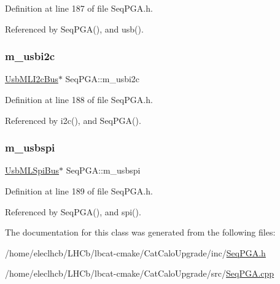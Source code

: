 Definition at line 187 of file Seq\+P\+G\+A.\+h.



Referenced by Seq\+P\+G\+A(), and usb().

\mbox{\label{classSeqPGA_a31d692cdc2f70dfd71671f3e2d688e20}} 
\subsubsection{\texorpdfstring{m\+\_\+usbi2c}{m\_usbi2c}}
{\footnotesize\ttfamily \hyperlink{classUsbMLI2cBus}{Usb\+M\+L\+I2c\+Bus}$\ast$ Seq\+P\+G\+A\+::m\+\_\+usbi2c\hspace{0.3cm}{\ttfamily [private]}}



Definition at line 188 of file Seq\+P\+G\+A.\+h.



Referenced by i2c(), and Seq\+P\+G\+A().

\mbox{\label{classSeqPGA_aeb7d559e042bced959366125781cef39}} 
\subsubsection{\texorpdfstring{m\+\_\+usbspi}{m\_usbspi}}
{\footnotesize\ttfamily \hyperlink{classUsbMLSpiBus}{Usb\+M\+L\+Spi\+Bus}$\ast$ Seq\+P\+G\+A\+::m\+\_\+usbspi\hspace{0.3cm}{\ttfamily [private]}}



Definition at line 189 of file Seq\+P\+G\+A.\+h.



Referenced by Seq\+P\+G\+A(), and spi().



The documentation for this class was generated from the following files\+:\begin{DoxyCompactItemize}
\item 
/home/eleclhcb/\+L\+H\+Cb/lbcat-\/cmake/\+Cat\+Calo\+Upgrade/inc/\hyperlink{SeqPGA_8h}{Seq\+P\+G\+A.\+h}\item 
/home/eleclhcb/\+L\+H\+Cb/lbcat-\/cmake/\+Cat\+Calo\+Upgrade/src/\hyperlink{SeqPGA_8cpp}{Seq\+P\+G\+A.\+cpp}\end{DoxyCompactItemize}
